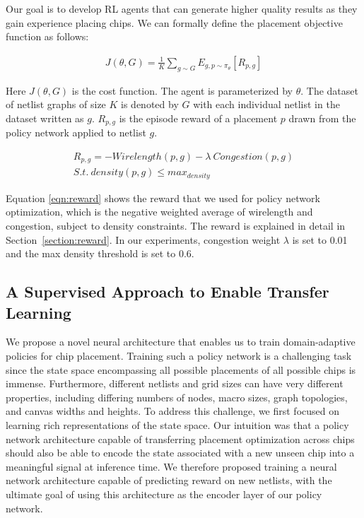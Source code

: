 \documentclass{article}
\begin{document}
Our goal is to develop RL agents that can generate higher quality results as they gain experience placing chips. We can formally define the placement objective function as follows:

\begin{eqnarray}
  \label{eqn:objective}
  J(\theta, G) = \frac{1}{K}\sum_{g\sim G}{E_{g,p\sim\pi_\theta}}[R_{p,g}]
\end{eqnarray}

 Here $J(\theta, G)$ is the cost function.  The agent is parameterized by $\theta$. The dataset of netlist graphs of size $K$ is denoted by $G$ with each individual netlist in the dataset written as $g$. $R_{p,g}$ is the episode reward of a placement $p$ drawn from the policy network applied to netlist $g$.

\begin{eqnarray}\label{eqn:reward}
R_{p,g} = -Wirelength(p,g) - \lambda~Congestion(p,g)  \\ \nonumber
S.t. ~density(p,g) \le max_{density}
\end{eqnarray}

Equation \ref{eqn:reward} shows the reward that we used for policy network optimization, which is the negative weighted average of wirelength and congestion, subject to density constraints. The reward is explained in detail in Section~\ref{section:reward}. In our experiments, congestion weight $\lambda$ is set to 0.01 and the max density threshold is set to 0.6.

\subsection{A Supervised Approach to Enable Transfer Learning}

We propose a novel neural architecture that enables us to train domain-adaptive policies for chip placement. Training such a policy network is a challenging task since the state space encompassing all possible placements of all possible chips is immense. Furthermore, different netlists and grid sizes can have very different properties, including differing numbers of nodes, macro sizes, graph topologies, and canvas widths and heights. To address this challenge, we first focused on learning rich representations of the state space. Our intuition was that a policy network architecture capable of transferring placement optimization across chips should also be able to encode the state associated with a new unseen chip into a meaningful signal at inference time. We therefore proposed training a neural network architecture capable of predicting reward on new netlists, with the ultimate goal of using this architecture as the encoder layer of our policy network.
\end{document}
